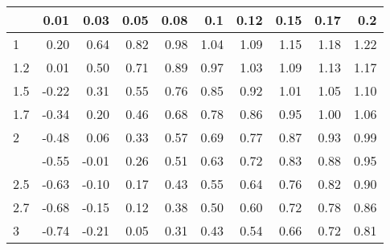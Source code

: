 
\begin{tabular}{lrrrrrrrrr}
\toprule
  & 0.01 & 0.03 & 0.05 & 0.08 & 0.1 & 0.12 & 0.15 & 0.17 & 0.2\\
\midrule
1 & 0.20 & 0.64 & 0.82 & 0.98 & 1.04 & 1.09 & 1.15 & 1.18 & 1.22\\
1.2 & 0.01 & 0.50 & 0.71 & 0.89 & 0.97 & 1.03 & 1.09 & 1.13 & 1.17\\
1.5 & -0.22 & 0.31 & 0.55 & 0.76 & 0.85 & 0.92 & 1.01 & 1.05 & 1.10\\
1.7 & -0.34 & 0.20 & 0.46 & 0.68 & 0.78 & 0.86 & 0.95 & 1.00 & 1.06\\
2 & -0.48 & 0.06 & 0.33 & 0.57 & 0.69 & 0.77 & 0.87 & 0.93 & 0.99\\
\addlinespace
2.2 & -0.55 & -0.01 & 0.26 & 0.51 & 0.63 & 0.72 & 0.83 & 0.88 & 0.95\\
2.5 & -0.63 & -0.10 & 0.17 & 0.43 & 0.55 & 0.64 & 0.76 & 0.82 & 0.90\\
2.7 & -0.68 & -0.15 & 0.12 & 0.38 & 0.50 & 0.60 & 0.72 & 0.78 & 0.86\\
3 & -0.74 & -0.21 & 0.05 & 0.31 & 0.43 & 0.54 & 0.66 & 0.72 & 0.81\\
\bottomrule
\end{tabular}
